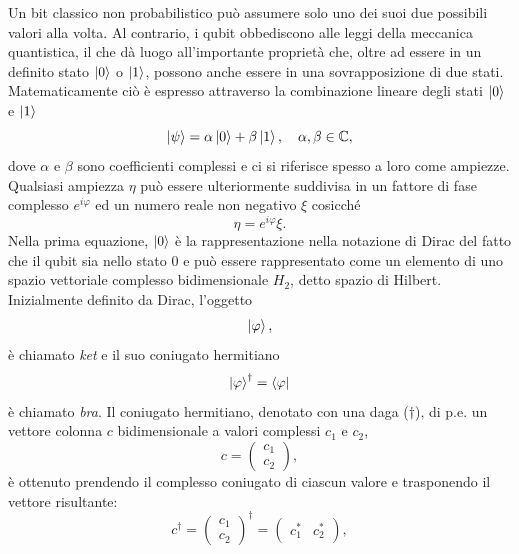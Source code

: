 Un bit classico non probabilistico può assumere solo uno dei suoi due possibili valori alla volta. 
Al contrario, i qubit obbediscono alle leggi della meccanica quantistica, il che dà luogo 
all'importante proprietà che, oltre ad essere in un definito stato $\ket{0}$ o $\ket{1}$, 
possono anche essere in una sovrapposizione di due stati. Matematicamente ciò è espresso 
attraverso la combinazione lineare degli stati $\ket{0}$ e $\ket{1}$
\begin{equation} \label{eq:2.1}
    \ket{\psi} = \alpha \ket{0} + \beta \ket{1}, \quad \alpha, \beta \in \mathbb{C},
\end{equation}
dove $\alpha$ e $\beta$ sono coefficienti complessi e ci si riferisce spesso a loro come ampiezze. 
Qualsiasi ampiezza $\eta$ può essere ulteriormente suddivisa in un fattore di fase complesso 
$e^{i\varphi}$ ed un numero reale non negativo $\xi$ cosicché
\begin{equation}
    \eta = e^{i\varphi} \xi.
\end{equation}
Nella prima equazione, $\ket{0}$ è la rappresentazione nella notazione di Dirac del fatto che il 
qubit sia nello stato 0 e può essere rappresentato come un elemento di uno spazio vettoriale 
complesso bidimensionale $H_2$, %
detto spazio di Hilbert. Inizialmente definito da Dirac, %
l'oggetto 
\begin{equation}
    \ket{\varphi},
\end{equation}
è chiamato \emph{ket} e il suo coniugato hermitiano 
\begin{equation}
    \ket{\varphi}^\dagger = \bra{\varphi}
\end{equation}
è chiamato \emph{bra}. Il coniugato hermitiano, denotato con una daga ($\dagger$), di p.e. un 
vettore colonna $c$ bidimensionale a valori complessi $c_1$ e $c_2$, 
\begin{equation}
    c = 
    \begin{pmatrix}
        c_1\\c_2
    \end{pmatrix},
\end{equation}
è ottenuto prendendo il complesso coniugato di ciascun valore e trasponendo il vettore risultante: 
\begin{equation}
    c^\dagger = 
    \begin{pmatrix}
        c_1\\c_2
    \end{pmatrix}^\dagger
    = 
    \begin{pmatrix}
        c_1^* & c_2^*
    \end{pmatrix},
\end{equation}
